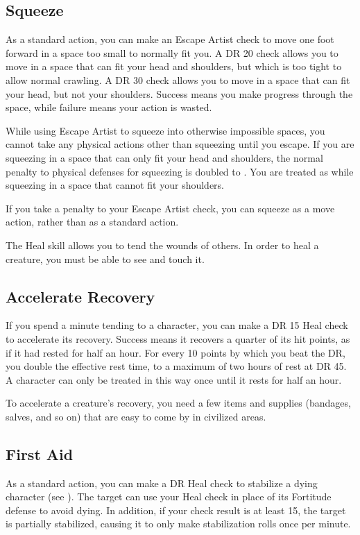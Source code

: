     \subsection{Squeeze}
        As a standard action, you can make an Escape Artist check to move one foot forward in a space too small to normally fit you. A DR 20 check allows you to move in a space that can fit your head and shoulders, but which is too tight to allow normal crawling. A DR 30 check allows you to move in a space that can fit your head, but not your shoulders. Success means you make progress through the space, while failure means your action is wasted.

        While using Escape Artist to squeeze into otherwise impossible spaces, you cannot take any physical actions other than squeezing until you escape. If you are squeezing in a space that can only fit your head and shoulders, the normal penalty to physical defenses for squeezing is doubled to . You are treated as \helpless while squeezing in a space that cannot fit your shoulders.

        If you take a  penalty to your Escape Artist check, you can squeeze as a move action, rather than as a standard action.

        The Heal skill allows you to tend the wounds of others. In order to heal a creature, you must be able to see and touch it.

    \subsection{Accelerate Recovery}\label{Accelerate Recovery}
        If you spend a minute tending to a character, you can make a DR 15 Heal check to accelerate its recovery.
        Success means it recovers a quarter of its hit points, as if it had rested for half an hour.
        For every 10 points by which you beat the DR, you double the effective rest time, to a maximum of two hours of rest at DR 45.
        A character can only be treated in this way once until it rests for half an hour.

        To accelerate a creature's recovery, you need a few items and supplies (bandages, salves, and so on) that are easy to come by in civilized areas.

    \subsection{First Aid}
        As a standard action, you can make a DR Heal check to stabilize a dying character (see ). The target can use your Heal check in place of its Fortitude defense to avoid dying. In addition, if your check result is at least 15, the target is partially stabilized, causing it to only make stabilization rolls once per minute.

